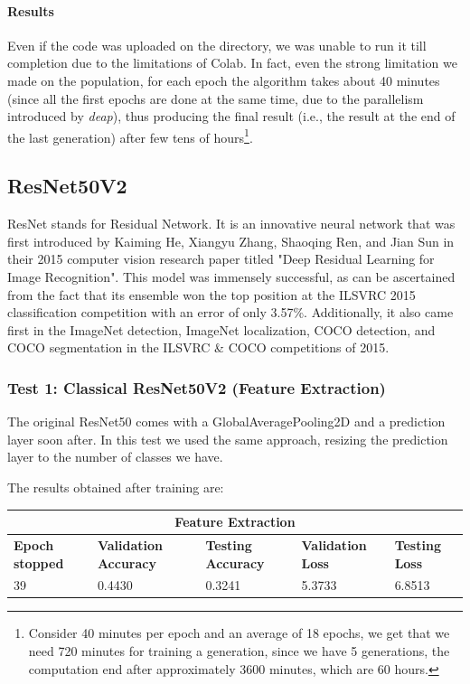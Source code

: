 \paragraph{Results}
Even if the code was uploaded on the directory, we was unable to run it till completion due to the limitations of Colab. In fact, even the strong limitation we made on the population, for each epoch the algorithm takes about 40 minutes (since all the first epochs are done at the same time, due to the parallelism introduced by \textit{deap}), thus producing the final result (i.e., the result at the end of the last generation) after few tens of hours\footnote{Consider 40 minutes per epoch and an average of 18 epochs, we get that we need 720 minutes for training a generation, since we have 5 generations, the computation end after approximately 3600 minutes, which are 60 hours.}.

\subsection{ResNet50V2}
ResNet stands for Residual Network. It is an innovative neural network that was first introduced by Kaiming He, Xiangyu Zhang, Shaoqing Ren, and Jian Sun in their 2015 computer vision research paper titled "Deep Residual Learning for Image Recognition". This model was immensely successful, as can be ascertained from the fact that its ensemble won the top position at the ILSVRC 2015 classification competition with an error of only 3.57\%. Additionally, it also came first in the ImageNet detection, ImageNet localization, COCO detection, and COCO segmentation in the ILSVRC \& COCO competitions of 2015.



\subsubsection{Test 1: Classical ResNet50V2 (Feature Extraction)}
The original ResNet50 comes with a GlobalAveragePooling2D and a prediction layer soon after. In this test we used the same approach, resizing the prediction layer to the number of classes we have.

\noindent The results obtained after training are:
\medskip

\begin{tabular}{ |p{2cm}|p{2cm}|p{2cm}|p{2cm}|p{2cm}|  }
\hline
\multicolumn{5}{|c|}{Feature Extraction} \\
\hline
\textbf{Epoch stopped} & \textbf{Validation Accuracy} & \textbf{Testing Accuracy} & \textbf{Validation Loss} & \textbf{Testing Loss} \\
\hline
39 & 0.4430 & 0.3241 & 5.3733 & 6.8513\\
\hline
\end{tabular}

